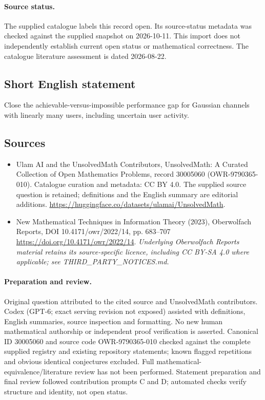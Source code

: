 \documentclass[11pt]{article}
\begin{document}
\paragraph{Source status.}
The supplied catalogue labels this record open. Its source-status metadata was checked against the supplied snapshot on 2026-10-11. This import does not independently establish current open status or mathematical correctness. The catalogue literature assessment is dated 2026-08-22.
\subsection{Short English statement}
Close the achievable-versus-impossible performance gap for Gaussian channels with linearly many users, including uncertain user activity.
\subsection{Sources}
\begin{itemize}
\item[S1] Ulam AI and the UnsolvedMath Contributors, UnsolvedMath: A Curated Collection of Open Mathematics Problems, record 30005060 (OWR-9790365-010). Catalogue curation and metadata: CC BY 4.0. The supplied source question is retained; definitions and the English summary are editorial additions.
\url{https://huggingface.co/datasets/ulamai/UnsolvedMath}.
\item[S2] New Mathematical Techniques in Information Theory (2023), Oberwolfach Reports, DOI 10.4171/owr/2022/14, pp. 683--707
\url{https://doi.org/10.4171/owr/2022/14}.
\textit{Underlying Oberwolfach Reports material retains its source-specific licence, including CC BY-SA 4.0 where applicable; see THIRD\_PARTY\_NOTICES.md.}
\end{itemize}
\paragraph{Preparation and review.}
Original question attributed to the cited source and UnsolvedMath contributors. Codex (GPT-6; exact serving revision not exposed) assisted with definitions, English summaries, source inspection and formatting. No new human mathematical authorship or independent proof verification is asserted. Canonical ID 30005060 and source code OWR-9790365-010 checked against the complete supplied registry and existing repository statements; known flagged repetitions and obvious identical conjectures excluded. Full mathematical-equivalence/literature review has not been performed. Statement preparation and final review followed contribution prompts C and D; automated checks verify structure and identity, not open status.
\label{end:30005060}
\end{document}
